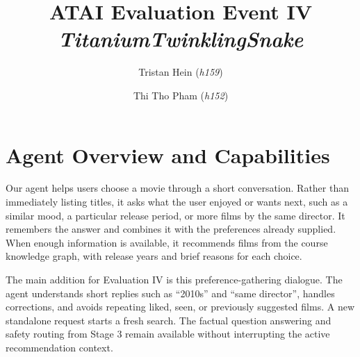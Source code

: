 \documentclass{article}
\begin{document}
\title{ATAI Evaluation Event IV\\[0.3em]
\large \textit{TitaniumTwinklingSnake}}
\author{Tristan Hein (\textit{h159}) \and Thi Tho Pham (\textit{h152})}
\date{}
\maketitle

\section{Agent Overview and Capabilities}
Our agent helps users choose a movie through a short conversation. Rather than
immediately listing titles, it asks what the user enjoyed or wants next, such as
a similar mood, a particular release period, or more films by the same director.
It remembers the answer and combines it with the preferences already supplied.
When enough information is available, it recommends films from the course
knowledge graph, with release years and brief reasons for each choice.

The main addition for Evaluation IV is this preference-gathering dialogue.
The agent understands short replies such as ``2010s'' and ``same director'',
handles corrections, and avoids repeating liked, seen, or previously suggested
films. A new standalone request starts a fresh search. The factual question
answering and safety routing from Stage 3 remain available without interrupting
the active recommendation context.
\end{document}
